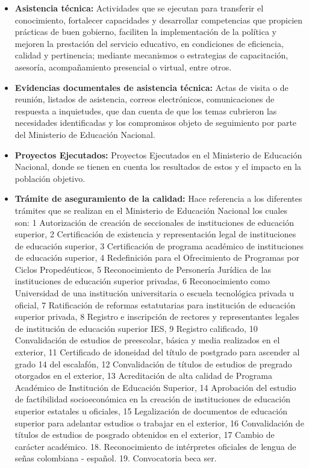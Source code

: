 \begin{itemize}
	\item \textbf{Asistencia técnica:} Actividades que se ejecutan para transferir el conocimiento, fortalecer capacidades y desarrollar competencias que propicien prácticas de buen gobierno, faciliten la implementación de la política y mejoren la prestación del servicio educativo, en condiciones de eficiencia, calidad y pertinencia; mediante mecanismos o estrategias de capacitación, asesoría, acompañamiento presencial o virtual, entre otros.
	\item \textbf{Evidencias documentales de asistencia técnica:} Actas de visita o de reunión, listados de asistencia, correos electrónicos, comunicaciones de respuesta a inquietudes, que dan cuenta de que los temas cubrieron las necesidades identificadas y los compromisos objeto de seguimiento por parte del Ministerio de Educación Nacional.
	\item \textbf{Proyectos Ejecutados:} Proyectos Ejecutados en el Ministerio de Educación Nacional, donde se tienen en cuenta los resultados de estos y el impacto en la población objetivo.
	\item \textbf{Trámite de aseguramiento de la calidad:} Hace referencia a los diferentes trámites que se realizan en el Ministerio de Educación Nacional los cuales son: 1 Autorización de creación de seccionales de instituciones de educación superior, 2 Certificación de existencia y representación legal de instituciones de educación superior, 3 Certificación de programa académico de instituciones de educación superior, 4 Redefinición para el Ofrecimiento de Programas por Ciclos Propedéuticos, 5 Reconocimiento de Personería Jurídica de las instituciones de educación superior privadas, 6 Reconocimiento como Universidad de una institución universitaria o escuela tecnológica privada u oficial, 7 Ratificación de reformas estatutarias para institución de educación superior privada, 8 Registro e inscripción de rectores y representantes legales de institución de educación superior IES, 9 Registro calificado, 10 Convalidación de estudios de preescolar, básica y media realizados en el exterior, 11 Certificado de idoneidad del título de postgrado para ascender al grado 14 del escalafón, 12 Convalidación de títulos de estudios de pregrado otorgados en el exterior, 13 Acreditación de alta calidad de Programa Académico de Institución de Educación Superior, 14 Aprobación del estudio de factibilidad socioeconómica en la creación de instituciones de educación superior estatales u oficiales, 15 Legalización de documentos de educación superior para adelantar estudios o trabajar en el exterior, 16 Convalidación de títulos de estudios de posgrado obtenidos en el exterior, 17 Cambio de carácter académico. 18. Reconocimiento de intérpretes oficiales de lengua de señas colombiana - español. 19. Convocatoria beca ser.

\end{itemize}
